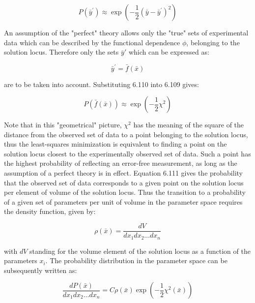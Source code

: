 \documentclass[10pt]{article}
\begin{document}
\begin{equation*}
P\left(\bar{y}^{\prime}\right) \approx \exp \left(-\frac{1}{2}\left(\bar{y}-\bar{y}^{\prime}\right)^{2}\right) \tag{6.113}
\end{equation*}


An assumption of the "perfect" theory allows only the "true" sets of experimental data which can be described by the functional dependence $\phi$, belonging to the solution locus. Therefore only the sets $\bar{y} \prime$ which can be expressed as:


\begin{equation*}
\bar{y}^{\prime}=\bar{f}(\bar{x}) \tag{6.114}
\end{equation*}


are to be taken into account. Substituting 6.110 into 6.109 gives:


\begin{equation*}
P(\bar{f}(\bar{x})) \approx \exp \left(-\frac{1}{2} \chi^{2}\right) \tag{6.115}
\end{equation*}


Note that in this "geometrical" picture, $\chi^{2}$ has the meaning of the square of the distance from the observed set of data to a point belonging to the solution locus, thus the least-squares minimization is equivalent to finding a point on the solution locus closest to the experimentally observed set of data. Such a point has the highest probability of reflecting an error-free measurement, as long as the assumption of a perfect theory is in effect. Equation 6.111 gives the probability that the observed set of data corresponds to a given point on the solution locus per element of volume of the solution locus. Thus the transition to a probability of a given set of parameters per unit of volume in the parameter space requires the density function, given by:


\begin{equation*}
\rho(\bar{x})=\frac{d V}{d x_{1} d x_{2} \ldots d x_{n}} \tag{6.116}
\end{equation*}


with $d V$ standing for the volume element of the solution locus as a function of the parameters $x_{i}$. The probability distribution in the parameter space can be subsequently written as:


\begin{equation*}
\frac{d P(\bar{x})}{d x_{1} d x_{2} \ldots d x_{n}}=C \rho(\bar{x}) \exp \left(-\frac{1}{2} \chi^{2}(\bar{x})\right) \tag{6.117}
\end{equation*}
\end{document}
